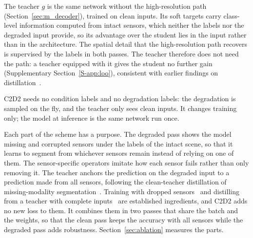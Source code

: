 The teacher $g$ is the same network without the high-resolution path (Section~\ref{sec:m_decoder}), trained on clean inputs. Its soft targets carry class-level information computed from intact sensors, which neither the labels nor the degraded input provide, so its advantage over the student lies in the input rather than in the architecture. The spatial detail that the high-resolution path recovers is supervised by the labels in both passes. The teacher therefore does not need the path: a teacher equipped with it gives the student no further gain (Supplementary Section~\ref{S-app:loo}), consistent with earlier findings on distillation~\cite{cho2019efficacy}.

C2D2 needs no condition labels and no degradation labels: the degradation is sampled on the fly, and the teacher only sees clean inputs. It changes training only; the model at inference is the same network run once.

Each part of the scheme has a purpose. The degraded pass shows the model missing and corrupted sensors under the labels of the intact scene, so that it learns to segment from whichever sensors remain instead of relying on one of them. The sensor-specific operators imitate how each sensor fails rather than only removing it. The teacher anchors the prediction on the degraded input to a prediction made from all sensors, following the clean-teacher distillation of missing-modality segmentation~\cite{anyseg2024,rmmss2025}. Training with dropped sensors~\cite{muses2024,cafuser2025} and distilling from a teacher with complete inputs~\cite{anyseg2024,rmmss2025} are established ingredients, and C2D2 adds no new loss to them. It combines them in two passes that share the batch and the weights, so that the clean pass keeps the accuracy with all sensors while the degraded pass adds robustness. Section~\ref{sec:ablation} measures the parts.
